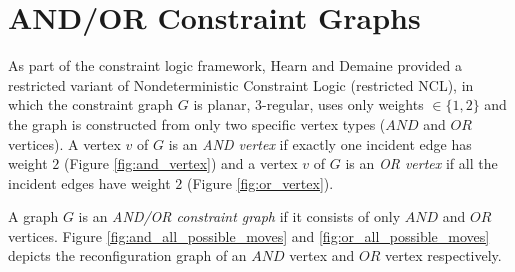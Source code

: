 \section{AND/OR Constraint Graphs} \label{sec:contraint_graph}
As part of the constraint logic framework,  Hearn and Demaine provided a restricted variant of Nondeterministic Constraint Logic (restricted NCL),
in which the constraint graph $G$ is planar, $3$-regular, uses only weights $ \in \{1,2\}$ and the graph is constructed from only two specific vertex
types ($AND$ and $OR$ vertices). A vertex $v$ of $G$ is an \textit{AND vertex} if exactly one incident edge has weight $2$ (Figure \ref{fig:and_vertex}) and
a vertex $v$ of $G$ is an \textit{OR vertex} if all the incident edges have weight $2$ (Figure \ref{fig:or_vertex}).

A graph $G$ is an \textit{AND/OR constraint graph} if it consists of only $AND$ and $OR$ vertices. Figure \ref{fig:and_all_possible_moves}
and \ref{fig:or_all_possible_moves} depicts the reconfiguration graph of an $AND$ vertex and $OR$ vertex respectively.

